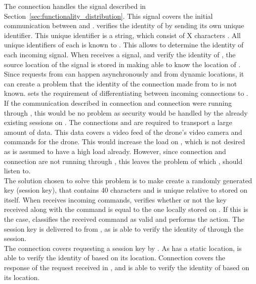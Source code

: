 The connection  handles the signal described in Section~\ref{sec:functionality_distribution}.
This signal covers the initial communication between  and .  verifies the identity of  by  sending its own unique identifier.
This unique identifier is a string, which consist of X characters .
All unique identifiers of each  is known to .
This allows  to determine the identity of each incoming signal. When  receives a signal, and verify the identity of , the source location of the signal is stored in  making  able to know the location of . \\

Since requests from  can happen asynchronously and from dynamic locations, it can create a problem that the identity of the connection made from  to  is not known. 
 sets the requirement of differentiating between incoming connections to .
If the communication described in connection  and connection  were running through , this would be no problem as security would be handled by the already existing sessions on .
The connections  and  are required to transport a large amount of data.
This data covers a video feed of the drone's video camera and commands for the drone.
This would increase the load on , which is not desired as  is assumed to have a high load already.
However, since connection  and connection  are not running through , this leaves the problem of which ,  should listen to. \\

The solution chosen to solve this problem is to make  create a randomly generated key (session key), that contains 40 characters and is unique relative to  stored on  itself.
When  receives incoming commands,  verifies whether or not the key received along with the command is equal to the one locally stored on .
If this is the case,  classifies the received command as valid and performs the action.
The session key is delivered to  from , as  is able to verify the identity of  through the session. \\

The connection  covers requesting a session key by .
As  has a static location,  is able to verify the identity of  based on its location.
Connection  covers the response of the request received in , and  is able to verify the identity of  based on its location. \\

